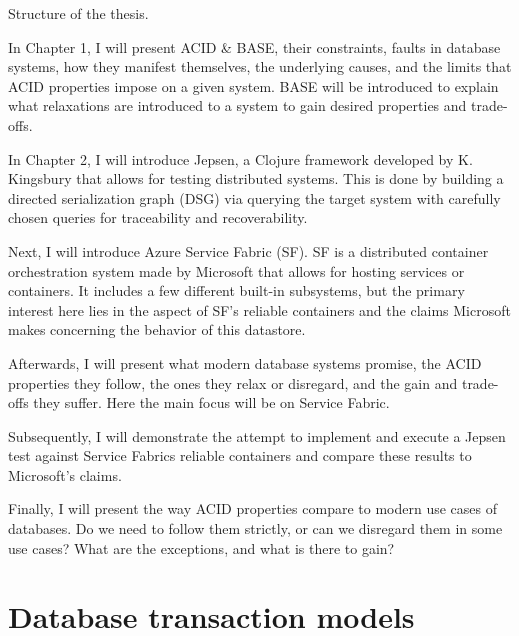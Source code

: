 \documentclass[a4paper,10pt,titlepage]{report}
\begin{document}
Structure of the thesis.

    In Chapter 1, I will present ACID \& BASE, their constraints, faults in database systems, how they manifest themselves, the underlying causes, and the limits that ACID properties impose on a given system. BASE will be introduced to explain what relaxations are introduced to a system to gain desired properties and trade-offs.\\
    \vspace{5mm}

    In Chapter 2, I will introduce Jepsen, a Clojure framework\cite{jepsonio} developed by K. Kingsbury that allows for testing distributed systems. This is done by building a directed serialization graph (DSG) via querying the target system with carefully chosen queries for traceability and recoverability.  \\
    \vspace{5mm}

    Next, I will introduce Azure Service Fabric (SF). SF is a distributed container orchestration system made by Microsoft that allows for hosting services or containers. It includes a few different built-in subsystems, but the primary interest here lies in the aspect of SF's reliable containers and the claims Microsoft makes concerning the behavior of this datastore.\\
    \vspace{5mm}

    Afterwards, I will present what modern database systems promise, the ACID properties they follow, the ones they relax or disregard, and the gain and trade-offs they suffer. Here the main focus will be on Service Fabric.\\
    \vspace{5mm}

    Subsequently,  I will demonstrate the attempt to implement and execute a Jepsen test against Service Fabrics reliable containers and compare these results to Microsoft's claims.\\
    \vspace{5mm}

    Finally, I will present the way ACID properties compare to modern use cases of databases. Do we need to follow them strictly, or can we disregard them in some use cases? What are the exceptions, and what is there to gain?\\


    \chapter{Database transaction models}
\end{document}
